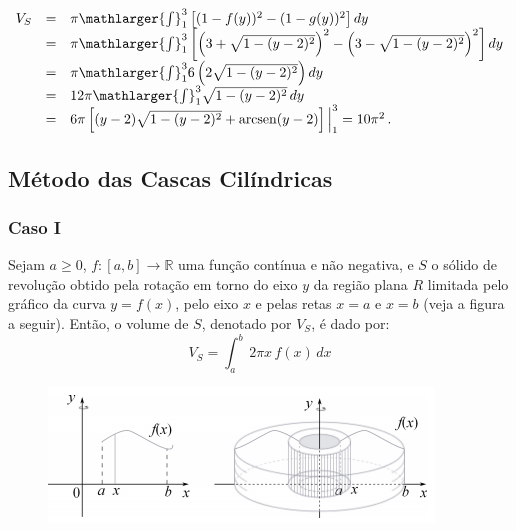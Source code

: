 \cleardoublepage\documentclass[../main.tex]{subfiles}
\begin{document}
\begin{ex}
\begin{compactenum}[a)]
\begin{solution}
\[ \begin{array}{rcl} V_S &=& \pi \mathlarger{\int}^{3}_{1}\left[ (1-f(y))^2 -(1-g(y))^2\right]dy \\ &=& \pi \mathlarger{\int}^{3}_{1}\left[ \left(3+\sqrt{1-(y-2)^2}\right)^2 -\left(3-\sqrt{1-(y-2)^2}\right)^2\right]dy \\ &=& \pi \mathlarger{\int}^{3}_{1} 6\left(2\sqrt{1-(y-2)^2}\right)dy \\ &=& 12\pi \mathlarger{\int}^{3}_{1} \sqrt{1-(y-2)^2}\,dy \\ &=& 6 \pi\left[ (y-2)\sqrt{1-(y-2)^2} + {\rm arcsen}(y-2)\right]\Big{|}^{3}_{1}= 10\pi^2\,. \end{array} \]
\end{solution}
\end{compactenum}
\end{ex}
\subsection{Método das Cascas Cilíndricas}
\subsubsection* {Caso I}
Sejam \(a\geq 0\), \(f:[a,b] \to \mathbb{R}\) uma função contínua e não negativa, e \(S\) o sólido de revolução obtido pela rotação em torno do eixo \(y\) da região plana \(R\) limitada pelo gráfico da curva \(y=f(x)\), pelo eixo \(x\) e pelas retas \(x=a\) e \(x=b\) (veja a figura a seguir). Então, o volume de \(S\), denotado por \(V_S\), é dado por:
\begin{equation}
    V_S=   \int^{b}_{a}\, 2\pi x\,f(x)\,dx \label{eq:VolMetCascasForm1}
\end{equation}
\begin{figure}[H]
    \centering
    \includegraphics{figs/Volume/VolSolCascascilindricas.png}
    \caption{}
\end{figure}
\end{document}
